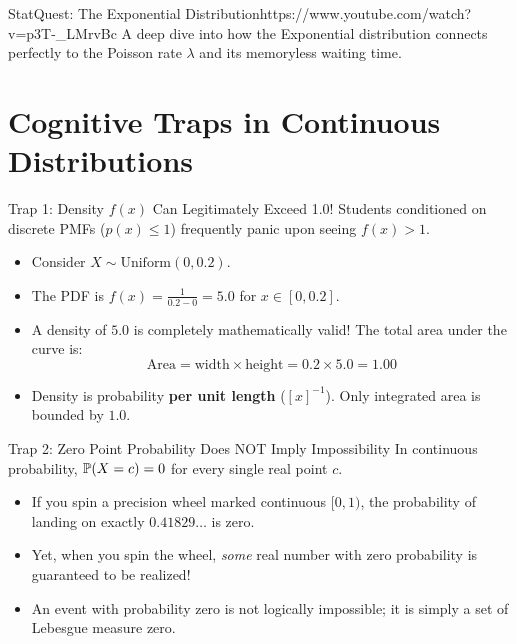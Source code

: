 \begin{videocard}{StatQuest: The Exponential Distribution}{https://www.youtube.com/watch?v=p3T-_LMrvBc}
A deep dive into how the Exponential distribution connects perfectly to the Poisson rate $\lambda$ and its memoryless waiting time.
\end{videocard}

\section{Cognitive Traps in Continuous Distributions}

\begin{trapbox}{Trap 1: Density $f(x)$ Can Legitimately Exceed 1.0!}
Students conditioned on discrete PMFs ($p(x) \le 1$) frequently panic upon seeing $f(x) > 1$.
\begin{itemize}
    \item Consider $X \sim \text{Uniform}(0, 0.2)$.
    \item The PDF is $f(x) = \frac{1}{0.2 - 0} = \mathbf{5.0}$ for $x \in [0, 0.2]$.
    \item A density of $5.0$ is completely mathematically valid! The total area under the curve is:
    $$\text{Area} = \text{width} \times \text{height} = 0.2 \times 5.0 = \mathbf{1.00}$$
    \item Density is probability \textbf{per unit length} ($[x]^{-1}$). Only integrated area is bounded by $1.0$.
\end{itemize}
\end{trapbox}

\begin{trapbox}{Trap 2: Zero Point Probability Does NOT Imply Impossibility}
In continuous probability, $\P(X = c) = 0$ for every single real point $c$.
\begin{itemize}
    \item If you spin a precision wheel marked continuous $[0, 1)$, the probability of landing on exactly $0.41829\dots$ is zero.
    \item Yet, when you spin the wheel, \emph{some} real number with zero probability is guaranteed to be realized!
    \item An event with probability zero is not logically impossible; it is simply a set of Lebesgue measure zero.
\end{itemize}
\end{trapbox}

